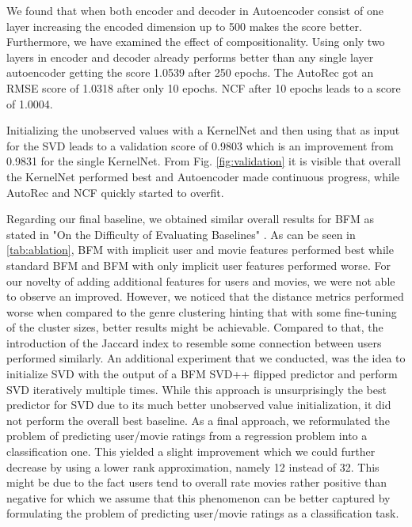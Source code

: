 \documentclass[10pt,conference,compsocconf]{IEEEtran}
\begin{document}
    We found that when both encoder and decoder in Autoencoder consist of one layer increasing the encoded dimension up to 500 makes
    the score better. Furthermore, we have examined the effect of compositionality. Using only two layers in encoder
    and decoder already performs better than any single layer autoencoder getting the score 1.0539 after 250 epochs. The AutoRec got an RMSE score of 1.0318 after only 10 epochs. NCF after 10 epochs leads to a score of 1.0004.

    Initializing the unobserved values with a KernelNet and then using that as input for the SVD leads to a validation score of 0.9803 which is an improvement from 0.9831 for the single KernelNet.
    From Fig. \ref{fig:validation} it is visible that overall the KernelNet performed best and Autoencoder made continuous progress, while AutoRec and NCF quickly started to overfit.

    Regarding our final baseline, we obtained similar overall results for BFM as stated in "On the Difficulty of Evaluating Baselines" \cite{rendle_difficulty_2019}.
    As can be seen in \cref{tab:ablation}, BFM with implicit user and movie features performed best while standard BFM and BFM with only implicit user features performed worse.
    For our novelty of adding additional features for users and movies, we were not able to observe an improved.
    However, we noticed that the distance metrics performed worse when compared to the genre clustering hinting that with some fine-tuning of the cluster sizes, better results might be achievable.
    Compared to that, the introduction of the Jaccard index to resemble some connection between users performed similarly.
    An additional experiment that we conducted, was the idea to initialize SVD with the output of a BFM SVD++ flipped predictor and perform SVD iteratively multiple times.
    While this approach is unsurprisingly the best predictor for SVD due to its much better unobserved value initialization, it did not perform the overall best baseline.
    As a final approach, we reformulated the problem of predicting user/movie ratings from a regression problem into a classification one.
    This yielded a slight improvement which we could further decrease by using a lower rank approximation, namely 12 instead of 32.
    This might be due to the fact users tend to overall rate movies rather positive than negative for which we assume that this phenomenon can be better captured by formulating the problem of predicting user/movie ratings as a classification task.
\end{document}
